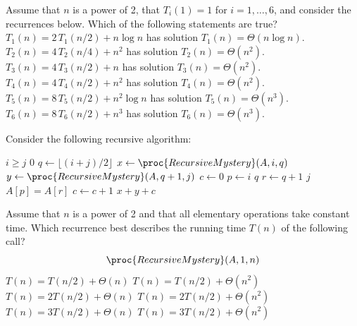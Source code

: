 Assume that $n$ is a power of 2, that $T_i(1)=1$ for $i=1,\dots,6$, and consider the recurrences below. Which of the following statements are true?
\multipleanswers
\optionsstart
\answer $T_1(n) = 2\,T_1(n/2) + n \log n$ has solution $T_1(n) = \Theta(n \log n)$.
\answer $T_2(n) = 4\,T_2(n/4) + n^2$ has solution $T_2(n) = \Theta(n^2)$.\correct
\answer $T_3(n) = 4\,T_3(n/2) + n$ has solution $T_3(n) = \Theta(n^2)$.\correct
\answer $T_4(n) = 4\,T_4(n/2) + n^2$ has solution $T_4(n) = \Theta(n^2)$.
\answer $T_5(n) = 8\,T_5(n/2) + n^2 \log n$ has solution $T_5(n) = \Theta(n^3)$.\correct
\answer $T_6(n) = 8\,T_6(n/2) + n^3$ has solution $T_6(n) = \Theta(n^3)$.
\optionsend
{}


Consider the following recursive algorithm:
\begin{codebox}
  \li \If $i \ge j$
  \li \Then
        \Return $0$
      \End
  \li $q \gets \lfloor (i+j)/2 \rfloor$
  \li $x \gets \proc{RecursiveMystery}(A,i,q)$
  \li $y \gets \proc{RecursiveMystery}(A,q+1,j)$
  \li $c \gets 0$
  \li \For $p \gets i$ \To $q$
  \li \Do
        \For $r \gets q+1$ \To $j$
  \li   \Do
          \If $A[p] = A[r]$
  \li     \Then
            $c \gets c+1$
          \End
        \End
      \End
  \li \Return $x+y+c$
\end{codebox}
Assume that \(n\) is a power of 2 and that all elementary operations take constant time.
Which recurrence best describes the running time \(T(n)\) of the following call?
\[
\proc{RecursiveMystery}(A,1,n)
\]
\oneanswer
\optionsstart
\answer \(T(n)=T(n/2)+\Theta(n)\)
\answer \(T(n)=T(n/2)+\Theta(n^2)\)
\answer \(T(n)=2T(n/2)+\Theta(n)\)
\answer \(T(n)=2T(n/2)+\Theta(n^2)\) \correct
\answer \(T(n)=3T(n/2)+\Theta(n)\)
\answer \(T(n)=3T(n/2)+\Theta(n^2)\)
\optionsend

